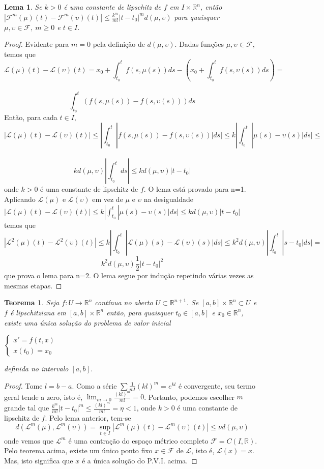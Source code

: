 \documentclass[a4paper, 12pt]{article}
\renewcommand{\Bbb}{\mathbb}
\newtheorem*{2}{Lema}
\newtheorem*{3}{Teorema}
\begin{document}
\begin{2}
Se $k>0$ é uma constante de lipschitz de $f$ em $I\times \Bbb R^n$, então $|\mathcal F^m(\mu)(t) - \mathcal F^m(\upsilon)(t)| \leq \frac{k^m}{m!}|t-t_0|^m d(\mu,\upsilon)$ para quaisquer $\mu,\upsilon \in \mathcal F,\ m \geq 0$ e $t\in I$.
\end{2}
\begin{proof}
Evidente para $m=0$ pela definição de $d(\mu,\upsilon)$. Dadas funções $\mu,\upsilon \in \mathcal F$, temos que 
$$\mathcal L(\mu)(t) - \mathcal L(\upsilon)(t) = x_0 + \int^t_{t_0} f(s,\mu(s))ds - (x_0 + \int^t_{t_0} f(s,\upsilon(s))ds) =$$\\
$$\int^t_{t_0} (f(s,\mu(s))- f(s,\upsilon(s)))ds$$
Então, para cada $t \in I$, 
$$|\mathcal L(\mu)(t) - \mathcal L(\upsilon)(t)| \leq |\int^t_{t_0}|f(s,\mu(s))-f(s,\upsilon(s))|ds| \leq k|\int^t_{t_0}|\mu(s)-\upsilon(s)|ds| \leq$$\\
$$kd(\mu,\upsilon)|\int^t_{t_0}ds| \leq kd(\mu,\upsilon)|t-t_0|$$
onde $k > 0$ é uma constante de lipschitz de $f$.
O lema está provado para n=1. Aplicando $\mathcal L(\mu)$ e $\mathcal L(\upsilon)$ em vez de $\mu$ e $\upsilon$ na desigualdade $|\mathcal L(\mu)(t) - \mathcal L(\upsilon)(t)| \leq k|\int^t_{t_0}|\mu(s)-\upsilon(s)|ds| \leq  kd(\mu,\upsilon)|t-t_0|$ temos que 
$$|\mathcal L^2(\mu)(t) - \mathcal L^2(\upsilon)(t)| \leq k|\int^t_{t_0}|\mathcal L(\mu)(s)-\mathcal L(\upsilon)(s)|ds| \leq k^2d(\mu,\upsilon)|\int^t_{t_0}|s-t_0|ds| =$$
$$k^2d(\mu,\upsilon)\frac{1}{2}|t-t_0|^2$$
que prova o lema para n=2.
O lema segue por indução repetindo várias vezes as mesmas etapas.
\end{proof}
\begin{3}
Seja $f:U\to \Bbb R^n$ contínua no aberto $U\subset \Bbb R^{n+1}$. Se $[a,b]\times \Bbb R^n \subset U$ e $f$ é lipschitziana em $[a,b]\times \Bbb R^n$ então, para quaisquer $t_0\in[a,b]$ e $x_0\in \Bbb R^n$, existe uma única solução do problema de valor inicial
\begin{center}
    $
    \begin{cases}
    x'=f(t,x)\\ x(t_0) = x_0
    \end{cases}
    $
\end{center}
definida no intervalo $[a,b]$.
\end{3}
\begin{proof}
Tome $l = b-a$. Como a série $\sum\frac{1}{m!}(kl)^m = e^{kl}$ é convergente, seu termo geral tende a zero, isto é, $\lim_{m\to 0}\frac{(kl)^m}{m!} = 0$. Portanto, podemos escolher $m$ grande tal que $\frac{k^m}{m!}|t-t_0|^m \leq \frac{(kl)^m}{m!} = \eta < 1$, onde $k > 0$ é uma constante de lipschitz de $f$. Pelo lema anterior, tem-se
$$d(\mathcal L^m(\mu),\mathcal L^m(\upsilon)) = \sup_{t\in I}|\mathcal L^m(\mu)(t)-\mathcal L^m(\upsilon)(t)| \leq \nu d(\mu,\upsilon)$$
onde vemos que $\mathcal L^m$ é uma contração do espaço métrico completo $\mathcal F = C(I,\Bbb R)$. Pelo teorema acima, existe um único ponto fixo $x\in \mathcal F$ de $\mathcal L$, isto é, $\mathcal L(x)=x$. Mas, isto significa que $x$ é a única solução do P.V.I. acima.
\end{proof}
\end{document}

